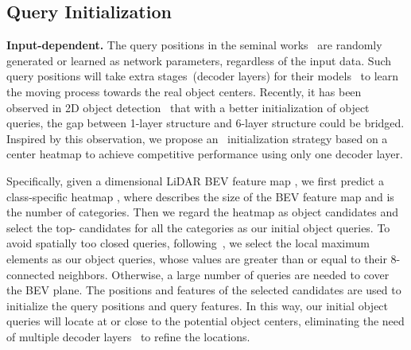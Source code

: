 \subsection{Query Initialization}
\label{subsubsec: query_initialize}
\noindent\textbf{Input-dependent.} The query positions in {the seminal} works~\cite{carion2020endtoend, Zhu2021DeformableDD, Sun2020SparseRE} are randomly generated or learned as network parameters{, regardless of the input {data}.}
Such \prevqueryinit~
query positions will take extra stages~(decoder layers) for 
{their models~\cite{carion2020endtoend, Zhu2021DeformableDD}}
to learn the moving process towards the real object centers. Recently, it has been {observed} in 2D object detection~\cite{Yao2021EfficientDI} that with a better initialization of object queries, the gap between 1-layer structure and 6-layer structure could be bridged. 
{Inspired by this observation,}
we propose an \ourqueryinit~initialization strategy based on a center heatmap to achieve competitive performance using only one decoder layer. 

{Specifically}, given a  dimensional LiDAR BEV feature map , we first predict a class-specific heatmap , where  {describes} the size of {the} BEV feature map and  is the number of categories. Then we regard the heatmap as  object candidates and select the top- candidates {for all the categories} as our initial object queries. 
To avoid spatially too closed queries, following~\cite{Zhou2019ObjectsAP},
we select {the} local maximum elements {as our object queries},
whose values are greater than or equal to {their} 8-connected neighbors. Otherwise{,} a large number of queries are needed to cover the BEV plane. 
The positions and features of the selected candidates are used to initialize the query positions and query features. In this way, our initial object queries will locate at or close to the potential object centers, eliminating the need of multiple decoder layers~\cite{misra20213detr, Liu2021GroupFree3O, Wang2021ObjectD3} to refine the locations.






